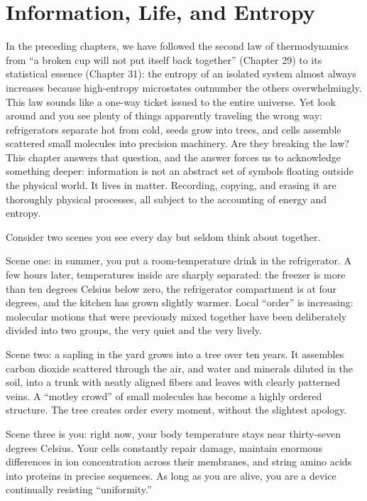 \chapter{Information, Life, and Entropy}

In the preceding chapters, we have followed the second law of thermodynamics from ``a broken cup will not put itself back together'' (Chapter 29) to its statistical essence (Chapter 31): the entropy of an isolated system almost always increases because high-entropy microstates outnumber the others overwhelmingly. This law sounds like a one-way ticket issued to the entire universe. Yet look around and you see plenty of things apparently traveling the wrong way: refrigerators separate hot from cold, seeds grow into trees, and cells assemble scattered small molecules into precision machinery. Are they breaking the law? This chapter answers that question, and the answer forces us to acknowledge something deeper: information is not an abstract set of symbols floating outside the physical world. It lives in matter. Recording, copying, and erasing it are thoroughly physical processes, all subject to the accounting of energy and entropy.


Consider two scenes you see every day but seldom think about together.

Scene one: in summer, you put a room-temperature drink in the refrigerator. A few hours later, temperatures inside are sharply separated: the freezer is more than ten degrees Celsius below zero, the refrigerator compartment is at four degrees, and the kitchen has grown slightly warmer. Local ``order'' is increasing: molecular motions that were previously mixed together have been deliberately divided into two groups, the very quiet and the very lively.

Scene two: a sapling in the yard grows into a tree over ten years. It assembles carbon dioxide scattered through the air, and water and minerals diluted in the soil, into a trunk with neatly aligned fibers and leaves with clearly patterned veins. A ``motley crowd'' of small molecules has become a highly ordered structure. The tree creates order every moment, without the slightest apology.

Scene three is you: right now, your body temperature stays near thirty-seven degrees Celsius. Your cells constantly repair damage, maintain enormous differences in ion concentration across their membranes, and string amino acids into proteins in precise sequences. As long as you are alive, you are a device continually resisting ``uniformity.''

